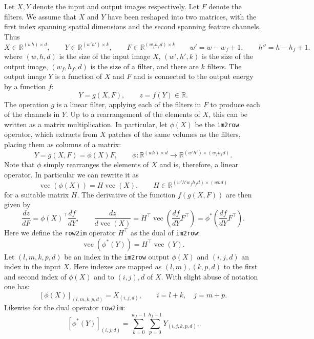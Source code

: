 \documentclass[12pt]{article}
\newcommand{\real}{\mathbb{R}}
\newcommand{\vv}{\operatorname{vec}}
\begin{document}
Let $X,Y$ denote the input and output images respectively. Let $F$ denote the filters. We assume that $X$ and $Y$ have been reshaped into two matrices, with the first index spanning spatial dimensions and the second spanning feature channels. Thus
\[
 X\in\real^{(wh) \times d}, \qquad
 Y\in\real^{(w'h') \times k}, \qquad
 F\in\real^{(w_fh_fd) \times k}
 \qquad
 w' = w - w_f + 1,
 \qquad
 h'' = h - h_f + 1.
\]
where $(w,h,d)$ is the size of the input image $X$, $(w',h',k)$ is the size of the output image, $(w_f,h_f,d)$ is the size of a filter, and there are $k$ filters. The output image $Y$ is a function of $X$ and $F$ and is connected to the output energy by a function $f$:
\[
Y = g(X,F),
\qquad
z = f(Y) \in \real.
\]
The operation $g$ is a linear filter, applying each of the filters in $F$ to produce each of the channels in $Y$. Up to a rearrangement of the elements of $X$, this can be written as a matrix multiplication. In particular, let $\phi(X)$ be the {\tt im2row} operator, which extracts from $X$ patches of the same volumes as the filters, placing them as columns of a matrix:
\[
 Y = g(X,F) = \phi(X) F,\qquad 
 \phi: \real^{(wh)\times d} \rightarrow \real^{(w'h')\times(w_fh_fd)}.
\]
Note that $\phi$ simply rearranges the elements of $X$ and is, therefore, a linear operator. In particular we can rewrite it as
\[
 \vv(\phi(X)) = H \vv(X), \qquad H \in \real^{(w'h'w_fh_fd) \times (whd)}
\]
for a suitable matrix $H$. The derivative of the function $f(g(X,F))$ are then given by
\[
\boxed{
\frac{dz}{dF}
=
\phi(X)^\top\frac{d f}{d Y},
\qquad
\frac{d z}{d \vv(X)}
=
H^\top
\vv\left(
\frac{d f}{d Y}F^\top
\right)
=
\phi^*\left(
\frac{d f}{d Y}F^\top
\right).
}
\]
Here we define the {\tt row2im} operator $H^\top$ as the dual of {\tt im2row}:
\[
 \vv(\phi^*(Y)) = H^\top \vv(Y).
\]
Let $(l,m,k,p,d)$ be an index in the {\tt im2row} output $\phi(X)$ and $(i,j,d)$ an index in the input $X$. Here indexes are mapped as $(l,m),(k,p,d)$ to the first and second index of $\phi(X)$ and to $(i,j),d$ of $X$. With slight abuse of notation one has:
\[
   [\phi(X)]_{(l,m,k,p,d)}= X_{(i,j,d)}, \qquad i=l+k,\quad j=m+p.
\]
Likewise for the dual operator {\tt row2im}:
\[
   [\phi^*(Y)]_{(i,j,d)} 
   = \sum_{k=0}^{w_f-1} \sum_{p=0}^{h_f-1} Y_{(i,j,k,p,d)}.
\]

\appendix
\end{document}
